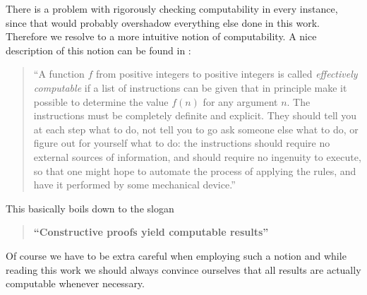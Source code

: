 There is a problem with rigorously checking computability in every instance, since that would probably overshadow everything else done in this work.
Therefore we resolve to a more intuitive notion of computability.\footnotemark
A nice description of this notion can be found in \cite{bbj07}:
\begin{quotation}
	``A function $f$ from positive integers to positive integers is called \emph{effectively computable} if a list of instructions can be given that in principle make it possible to determine the value $f(n)$ for any argument $n$. The instructions must be completely definite and explicit. They should tell you at each step what to do, not tell you to go ask someone else what to do, or figure out for yourself what to do: the instructions should require no external sources of information, and should require no ingenuity to execute, so that one might hope to automate the process of applying the rules, and have it performed by some mechanical device.''
\end{quotation}
This basically boils down to the slogan
\begin{quotation}
	\textbf{``Constructive proofs yield computable results''}
\end{quotation}
Of course we have to be extra careful when employing such a notion and while reading this work we should always convince ourselves that all results are actually computable whenever necessary.
